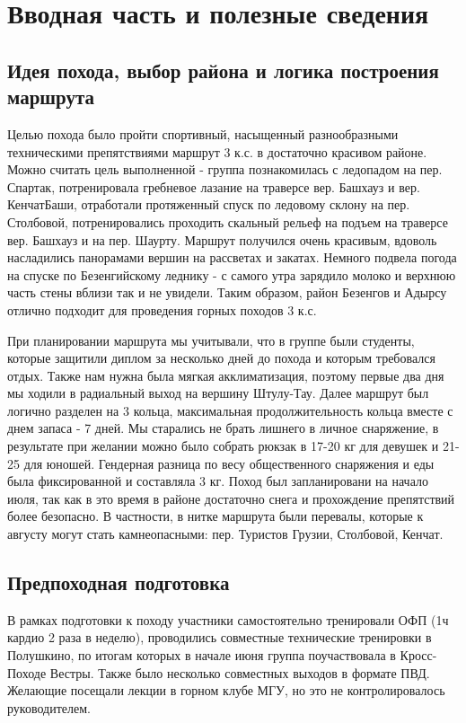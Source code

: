 \section{Вводная часть и полезные сведения}\label{sec:introduction}
	\subsection{Идея похода, выбор района и логика построения маршрута}
		Целью похода было пройти спортивный, насыщенный разнообразными техническими препятствиями маршрут 3 к.с. в достаточно красивом районе. Можно считать цель выполненной - группа познакомилась с ледопадом на пер. Спартак, потренировала гребневое лазание на траверсе вер. Башхауз и вер. КенчатБаши, отработали протяженный спуск по ледовому склону на пер. Столбовой, потренировались проходить скальный рельеф на подъем на траверсе вер. Башхауз и на пер. Шаурту. Маршрут получился очень красивым, вдоволь насладились панорамами вершин на рассветах и закатах. Немного подвела погода на спуске по Безенгийскому леднику - с самого утра зарядило молоко и верхнюю часть стены вблизи так и не увидели. Таким образом, район Безенгов и Адырсу отлично подходит для проведения горных походов 3 к.с. 
  
 При планировании маршрута мы учитывали, что в группе были студенты, которые защитили диплом за несколько дней до похода и которым требовался отдых. Также нам нужна была мягкая акклиматизация, поэтому первые два дня мы ходили в радиальный выход на вершину Штулу-Тау. Далее маршрут был логично разделен на 3 кольца, максимальная продолжительность кольца вместе с днем запаса - 7 дней. Мы старались не брать лишнего в личное снаряжение, в результате при желании 
можно было собрать рюкзак в 17-20 кг для девушек и 21-25 для юношей. Гендерная разница по весу общественного снаряжения и еды была фиксированной и составляла 3 кг. Поход был запланировани на начало июля, так как в это время в районе достаточно снега и прохождение препятствий более безопасно. В частности, в нитке маршрута были перевалы, которые к августу могут стать камнеопасными: пер. Туристов Грузии, Столбовой, Кенчат.
	
	
	\subsection{Предпоходная подготовка}
		В рамках подготовки к походу участники самостоятельно тренировали ОФП (1ч 
кардио 2 раза в неделю), проводились совместные технические тренировки в 
Полушкино, по итогам которых в начале июня группа поучаствовала в Кросс-Походе Вестры. Также было несколько совместных выходов в 
формате ПВД. Желающие посещали лекции в горном клубе МГУ, но это не контролировалось руководителем.
	

